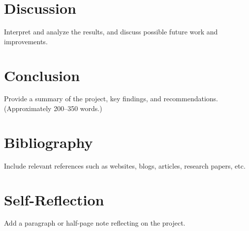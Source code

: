 \documentclass[12pt]{article}
\begin{document}
\section{Discussion}
Interpret and analyze the results, and discuss possible future work and improvements.

\section{Conclusion}
Provide a summary of the project, key findings, and recommendations. (Approximately 200--350 words.)

\section{Bibliography}
Include relevant references such as websites, blogs, articles, research papers, etc.

\section{Self-Reflection}
Add a paragraph or half-page note reflecting on the project.
\end{document}

